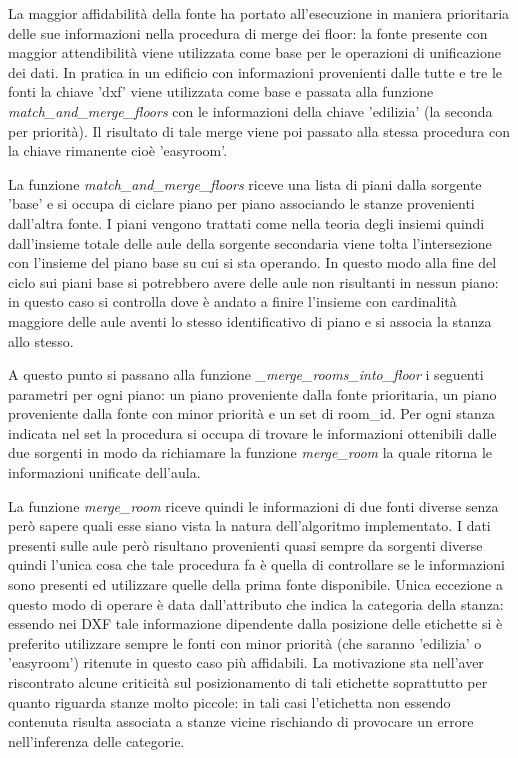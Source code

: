 \documentclass[12pt]{report}
\begin{document}
La maggior affidabilità della fonte ha portato all'esecuzione in maniera prioritaria delle sue informazioni nella procedura di merge dei floor: la fonte presente con maggior attendibilità viene utilizzata come base per le operazioni di unificazione dei dati.
In pratica in un edificio con informazioni provenienti dalle tutte e tre le fonti la chiave 'dxf' viene utilizzata come base e passata alla funzione \textit{match\_and\_merge\_floors} con le informazioni della chiave 'edilizia' (la seconda per priorità). Il risultato di tale merge viene poi passato alla stessa procedura con la chiave rimanente cioè 'easyroom'.

La funzione \textit{match\_and\_merge\_floors} riceve una lista di piani dalla sorgente 'base' e si occupa di ciclare piano per piano associando le stanze provenienti dall'altra fonte. I piani vengono trattati come nella teoria degli insiemi quindi dall'insieme totale delle aule della sorgente secondaria viene tolta l'intersezione con l'insieme del piano base su cui si sta operando. In questo modo alla fine del ciclo sui piani base si potrebbero avere delle aule non risultanti in nessun piano: in questo caso si controlla dove è andato a finire l'insieme con cardinalità maggiore delle aule aventi lo stesso identificativo di piano e si associa la stanza allo stesso.

A questo punto si passano alla funzione \textit{\_merge\_rooms\_into\_floor} i seguenti parametri per ogni piano: un piano proveniente dalla fonte prioritaria, un piano proveniente dalla fonte con minor priorità e un set di room\_id.
Per ogni stanza indicata nel set la procedura si occupa di trovare le informazioni ottenibili dalle due sorgenti in modo da richiamare la funzione \textit{merge\_room} la quale ritorna le informazioni unificate dell'aula.

La funzione \textit{merge\_room} riceve quindi le informazioni di due fonti diverse senza però sapere quali esse siano vista la natura dell'algoritmo implementato.
I dati presenti sulle aule però risultano provenienti quasi sempre da sorgenti diverse quindi l'unica cosa che tale procedura fa è quella di controllare se le informazioni sono presenti ed utilizzare quelle della prima fonte disponibile.
Unica eccezione a questo modo di operare è data dall'attributo che indica la categoria della stanza: essendo nei DXF tale informazione dipendente dalla posizione delle etichette si è preferito utilizzare sempre le fonti con minor priorità (che saranno 'edilizia' o 'easyroom') ritenute in questo caso più affidabili.
La motivazione sta nell'aver riscontrato alcune criticità sul posizionamento di tali etichette soprattutto per quanto riguarda stanze molto piccole: in tali casi l'etichetta non essendo contenuta risulta associata a stanze vicine rischiando di provocare un errore nell'inferenza delle categorie.
\end{document}
